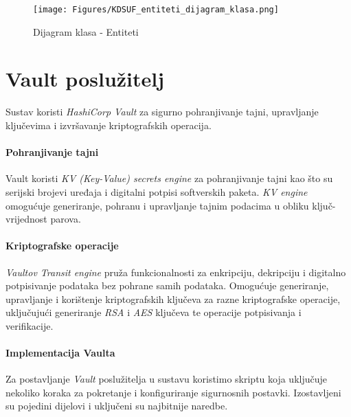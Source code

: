 \documentclass[zavrsnirad]{fer}
\begin{document}
	\begin{figure}[H]
		\centering
		\texttt{[image: Figures/KDSUF\_entiteti\_dijagram\_klasa.png]} 
		\caption{Dijagram klasa - Entiteti}
		\label{slk:entiteti_dijagram_klasa}
	\end{figure}
	
	
	\section{Vault poslužitelj}
	\label{backend:funkcionalnosti}
	Sustav koristi \textit{HashiCorp Vault} za sigurno pohranjivanje tajni, upravljanje ključevima i izvršavanje kriptografskih operacija. 
	
	\paragraph{Pohranjivanje tajni} Vault koristi \textit{KV (Key-Value) secrets engine} za pohranjivanje tajni kao što su serijski brojevi uređaja i digitalni potpisi softverskih paketa. \textit{KV engine} omogućuje generiranje, pohranu i upravljanje tajnim podacima u obliku ključ-vrijednost parova.
	
	\paragraph{Kriptografske operacije} \textit{Vaultov Transit engine} pruža funkcionalnosti za enkripciju, dekripciju i digitalno potpisivanje podataka bez pohrane samih podataka. Omogućuje generiranje, upravljanje i korištenje kriptografskih ključeva za razne kriptografske operacije, uključujući generiranje \textit{RSA} i \textit{AES} ključeva te operacije potpisivanja i verifikacije. 
	
	\paragraph{Implementacija Vaulta} Za postavljanje \textit{Vault} poslužitelja u sustavu koristimo skriptu koja uključuje nekoliko koraka za pokretanje i konfiguriranje sigurnosnih postavki. Izostavljeni su pojedini dijelovi i uključeni su najbitnije naredbe.
	
\end{document}
